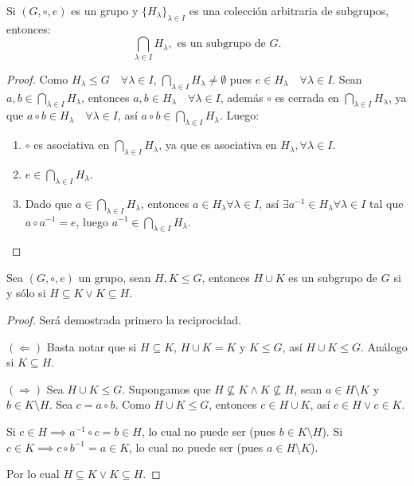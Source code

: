 \begin{prop}
	Si $(G, \circ, e)$ es un grupo y $\{H_\lambda\}_{\lambda \in I}$ es una colección arbitraria de subgrupos, entonces:
	\begin{equation*}
		\bigcap_{\lambda \in I} H_\lambda, \text{ es un subgrupo de } G.
	\end{equation*}
\end{prop}

\begin{proof}
	Como $H_\lambda \le G \quad \forall \lambda \in I$, $\bigcap_{\lambda \in I} H_\lambda \neq \emptyset$ pues $e \in H_\lambda \quad \forall \lambda \in I$.
	Sean $a, b \in \bigcap_{\lambda \in I} H_\lambda$, entonces $a, b \in H_\lambda \quad \forall \lambda \in I$, además $\circ$ es cerrada en $\bigcap_{\lambda \in I} H_\lambda$, ya que $a \circ b \in H_\lambda \quad \forall \lambda \in I$, así $a \circ b \in \bigcap_{\lambda \in I} H_\lambda$.
	Luego:
	\begin{enumerate}[label=\roman*), font=\normalfont]
		\item $\circ$ es asociativa en $\bigcap_{\lambda \in I} H_\lambda$, ya que es asociativa en $H_{\lambda}, \forall \lambda \in I$.
		\item $e \in \bigcap_{\lambda \in I} H_\lambda$.
		\item Dado que $a \in \bigcap_{\lambda \in I} H_\lambda$, entonces $a \in H_\lambda \forall \lambda \in I$, así $\exists a^{-1} \in H_\lambda \forall \lambda \in I$ tal que $a \circ a^{-1} = e$, luego $a^{-1} \in \bigcap_{\lambda \in I} H_\lambda$.
	\end{enumerate}
\end{proof}

\begin{prop}
	Sea $(G, \circ, e)$ un grupo, sean $H, K \le G$, entonces $H \cup K$ es un subgrupo de $G$ si y sólo si $H \subseteq K \lor K \subseteq H$.
\end{prop}

\begin{proof} Será demostrada primero la reciprocidad.\par
	$(\Leftarrow)$ Basta notar que si $H \subseteq K$, $H \cup K = K$ y $K \le G$, así $H \cup K \le G$. Análogo si $K \subseteq H$.

	$(\Rightarrow)$ Sea $H \cup K \le G$. Supongamos que $H \not\subseteq K \land K \not\subseteq H$, sean $a \in H \setminus K$ y $b \in K \setminus H$.
	Sea $c = a \circ b$. Como $H \cup K \le G$, entonces $c \in H \cup K$, así $c \in H \lor c \in K$.

	Si $c \in H \implies a^{-1} \circ c = b \in H$, lo cual no puede ser (pues $b \in K \setminus H$).
	Si $c \in K \implies c \circ b^{-1} = a \in K$, lo cual no puede ser (pues $a \in H \setminus K$).

	Por lo cual $H \subseteq K \lor K \subseteq H$.
\end{proof}

